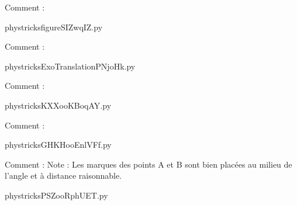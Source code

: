     Comment : 

    \clearpage
    


    \newcommand{\CaptionFigfigureSIZwqIZ}{<+Type your caption here+>}
    \begin{center}
        
    \end{center}
    phystricksfigureSIZwqIZ.py

    Comment : 

    \clearpage
    


    \newcommand{\CaptionFigExoTranslationPNjoHk}{<+Type your caption here+>}
    \begin{center}
        
    \end{center}
    phystricksExoTranslationPNjoHk.py

    Comment : 

    \clearpage
    


    \newcommand{\CaptionFigKXXooKBoqAY}{<+Type your caption here+>}
    \begin{center}
        
    \end{center}
    phystricksKXXooKBoqAY.py

    Comment : 

    \clearpage
    


    \newcommand{\CaptionFigGHKHooEnlVFf}{<+Type your caption here+>}
    \begin{center}
        
    \end{center}
    phystricksGHKHooEnlVFf.py

    Comment : Note : Les marques des points A et B sont bien placées au milieu de l'angle et à distance raisonnable.

    \clearpage
    


    \newcommand{\CaptionFigPSZooRphUET}{<+Type your caption here+>}
    \begin{center}
        
    \end{center}
    phystricksPSZooRphUET.py

